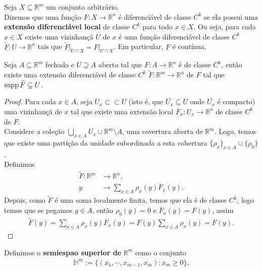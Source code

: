 \begin{definition}
  Seja $X\subseteq\mathbb{R}^{m}$ um conjunto arbitrário.\\
  Dizemos que uma função $F:X\to\mathbb{R}^{n}$ é diferenciável de classe $C^{k}$ se ela possui uma \textbf{extensão diferenciável local} de classe $C^{k}$ para todo $x\in X$. Ou seja, para cada $x\in X$ existe uma vizinhançã $U$ de $x$ é uma função diferenciável de classe $C^{k}$ $\tilde{F}:U\to\mathbb{R}^{n}$ tais que $\tilde{F}\big|_{U\cap X}=F\big|_{U\cap X}$. Em particular, $F$ é contínua. 
\end{definition}
\begin{lemma}
  Seja $A\subseteq\mathbb{R}^{m}$ fechado e $U\supseteq A$ aberto tal que $F:A\to\mathbb{R}^{n}$ é de classe $C^{k}$, então existe uma extensão diferenciável de classe $C^{k}$ $\tilde{F}:\mathbb{R}^{m}\to\mathbb{R}^{n}$ de $F$ tal que $\operatorname{supp}\widetilde{F}\subseteq U$. 
\end{lemma}
\begin{proof} 
  Para cada $x\in A$, seja $U_x\subset\subset U$ (isto é, que $\overline{U_x}\subseteq U$ onde $\overline{U_x}$ é compacto) uma vizinhançã de $x$ tal que existe uma extensão local $\overline{F}_x:U_x\to\mathbb{R}^{n}$ de classe $C^{k}$ de $F$.\\
  Considere a coleção $\displaystyle \bigcup_{x\in A}U_x\cup \mathbb{R}^{m}\setminus A$, uma covertura aberta de $\mathbb{R}^{m}$. Logo, temos que existe uma partição da unidade subordinada a esta cobertura $\{\rho_x\}_{x\in A}\cup\{\rho_0\}$.\\
  Definimos 
  \begin{align*}
    \tilde{F}:\mathbb{R}^{m}&\to\mathbb{R}^{n},\\
                          y &\to\sum_{x\in A}\rho_{x}(y)\overline{F}_x(y).
  \end{align*}
  Depois, como $\tilde{F}$ é uma soma localmente finita, temos que ela é de classe $C^{k}$, logo temos que se pegamos $y\in A$, então $\rho_0(y)=0$ e $\overline{F}_x(y)=F(y)$, assim
  \begin{align*}
    \tilde{F}(y)=\sum_{x\in A}\rho_x(y)\overline{F}_x(y)=F(y)\sum_{x\in A}\rho_x(y)=F(y).
  \end{align*}
\end{proof}
\begin{definition}
  Definimos o \textbf{semiespao superior de }$\mathbb{R}^{m}$ como o conjunto
  \begin{align*}
    \mathbb{H}^{m}:=\{(x_1,\cdots,x_{m-1},x_m): x_m\geq 0\}.
  \end{align*}
\end{definition}
